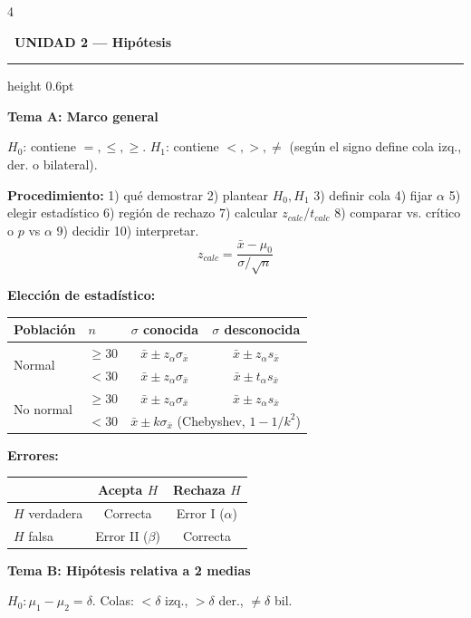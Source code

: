 \documentclass[9pt,a4paper]{article}
\newcommand{\bodysize}{\fontsize{9.2}{10.8}\selectfont}
\newcommand{\notesize}{\fontsize{7.8}{9.1}\selectfont}
\newcommand{\subsize}{\fontsize{10.5}{12.3}\selectfont\bfseries}
\newcommand{\unitsize}{\fontsize{13.5}{15.5}\selectfont\bfseries}
\newcommand{\unithead}[2]{%
  \par\vspace{2.5pt}
  \noindent\colorbox{#1!22}{\textcolor{#1!65!black}{\unitsize\ #2}}%
  \par\vspace{1.5pt}\hrule height 0.6pt \color{#1!55!black}\vspace{2pt}\color{black}%
}
\newcommand{\topic}[2]{\subsize\textcolor{#1!60!black}{#2}\par\vspace{0.5pt}\bodysize}
\begin{document}
\bodysize

\begin{multicols}{4}

\unithead{blue}{UNIDAD 2 --- Hipótesis}

\topic{blue}{Tema A: Marco general}
$H_0$: contiene $=,\leq,\geq$. \quad $H_1$: contiene $<,>,\neq$ (según el signo define cola izq., der. o bilateral).

\textbf{Procedimiento:} 1) qué demostrar 2) plantear $H_0,H_1$ 3) definir cola 4) fijar $\alpha$ 5) elegir estadístico 6) región de rechazo 7) calcular $z_{calc}$/$t_{calc}$ 8) comparar vs. crítico o $p$ vs $\alpha$ 9) decidir 10) interpretar.
\[
z_{calc} = \frac{\bar{x}-\mu_0}{\sigma/\sqrt{n}}
\]

\textbf{Elección de estadístico:}
\begin{center}
{\notesize
\setlength{\tabcolsep}{2.5pt}
\begin{tabular}{@{}ll c c@{}}
\toprule
Población & $n$ & $\sigma$ conocida & $\sigma$ desconocida \\
\midrule
\multirow{2}{*}{Normal} & $\geq30$ & $\bar{x}\pm z_\alpha\sigma_{\bar{x}}$ & $\bar{x}\pm z_\alpha s_{\bar{x}}$ \\
 & $<30$ & $\bar{x}\pm z_\alpha\sigma_{\bar{x}}$ & $\bar{x}\pm t_\alpha s_{\bar{x}}$ \\
\multirow{2}{*}{No normal} & $\geq30$ & $\bar{x}\pm z_\alpha\sigma_{\bar{x}}$ & $\bar{x}\pm z_\alpha s_{\bar{x}}$ \\
 & $<30$ & \multicolumn{2}{c}{$\bar{x}\pm k\sigma_{\bar{x}}$ (Chebyshev, $1-1/k^2$)} \\
\bottomrule
\end{tabular}
}
\end{center}

\textbf{Errores:}
\begin{center}
{\notesize
\setlength{\tabcolsep}{4pt}
\begin{tabular}{@{}l c c@{}}
\toprule
 & Acepta $H$ & Rechaza $H$ \\
\midrule
$H$ verdadera & Correcta & Error I ($\alpha$) \\
$H$ falsa & Error II ($\beta$) & Correcta \\
\bottomrule
\end{tabular}
}
\end{center}

\topic{blue}{Tema B: Hipótesis relativa a 2 medias}
$H_0: \mu_1-\mu_2=\delta$. Colas: $<\delta$ izq., $>\delta$ der., $\neq\delta$ bil.


\end{multicols}
\end{document}
